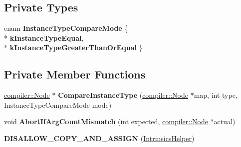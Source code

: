 \subsection*{Private Types}
\begin{DoxyCompactItemize}
\item 
enum {\bfseries Instance\+Type\+Compare\+Mode} \{ \\*
{\bfseries k\+Instance\+Type\+Equal}, 
\\*
{\bfseries k\+Instance\+Type\+Greater\+Than\+Or\+Equal}
 \}\hypertarget{classv8_1_1internal_1_1interpreter_1_1_intrinsics_helper_af2deb7fc0d18cf21fb5797308b5afe84}{}\label{classv8_1_1internal_1_1interpreter_1_1_intrinsics_helper_af2deb7fc0d18cf21fb5797308b5afe84}

\end{DoxyCompactItemize}
\subsection*{Private Member Functions}
\begin{DoxyCompactItemize}
\item 
\hyperlink{classv8_1_1internal_1_1compiler_1_1_node}{compiler\+::\+Node} $\ast$ {\bfseries Compare\+Instance\+Type} (\hyperlink{classv8_1_1internal_1_1compiler_1_1_node}{compiler\+::\+Node} $\ast$map, int type, Instance\+Type\+Compare\+Mode mode)\hypertarget{classv8_1_1internal_1_1interpreter_1_1_intrinsics_helper_a3e062b071838278b3668182d199c6118}{}\label{classv8_1_1internal_1_1interpreter_1_1_intrinsics_helper_a3e062b071838278b3668182d199c6118}

\item 
void {\bfseries Abort\+If\+Arg\+Count\+Mismatch} (int expected, \hyperlink{classv8_1_1internal_1_1compiler_1_1_node}{compiler\+::\+Node} $\ast$actual)\hypertarget{classv8_1_1internal_1_1interpreter_1_1_intrinsics_helper_af94f9fee9cad4d11a4e80377eafa0f22}{}\label{classv8_1_1internal_1_1interpreter_1_1_intrinsics_helper_af94f9fee9cad4d11a4e80377eafa0f22}

\item 
{\bfseries D\+I\+S\+A\+L\+L\+O\+W\+\_\+\+C\+O\+P\+Y\+\_\+\+A\+N\+D\+\_\+\+A\+S\+S\+I\+GN} (\hyperlink{classv8_1_1internal_1_1interpreter_1_1_intrinsics_helper}{Intrinsics\+Helper})\hypertarget{classv8_1_1internal_1_1interpreter_1_1_intrinsics_helper_a3a75adf9677021424f2fe2983f767b48}{}\label{classv8_1_1internal_1_1interpreter_1_1_intrinsics_helper_a3a75adf9677021424f2fe2983f767b48}

\end{DoxyCompactItemize}
